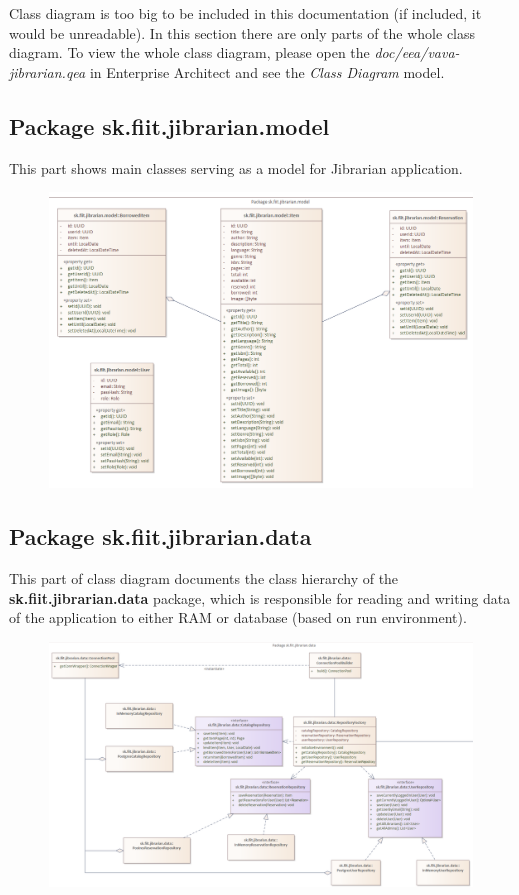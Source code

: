 \documentclass[11pt,twoside,a4paper]{article}
\begin{document}
Class diagram is too big to be included in this documentation (if included, it would
be unreadable). In this section there are only parts of the whole class diagram.
To view the whole class diagram, please open the \emph{doc/eea/vava-jibrarian.qea}
in Enterprise Architect and see the \emph{Class Diagram} model.

\subsection{Package sk.fiit.jibrarian.model}

This part shows main classes serving as a model for Jibrarian application.

\begin{figure}[!ht]
    \includegraphics[scale=.5]{../ea/Class Diagram model.png}
    \centering
\end{figure}

\subsection{Package sk.fiit.jibrarian.data}

This part of class diagram documents the class hierarchy of the
\textbf{sk.fiit.jibrarian.data} package, which is responsible for reading and
writing data of the application to either RAM or database (based on run environment).

\begin{figure}[!ht]
    \includegraphics[scale=.35]{../ea/Class Diagram data.png}
    \centering
\end{figure}
\end{document}
